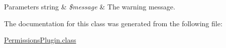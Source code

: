 \begin{DoxyParams}[1]{Parameters}
string & {\em \$message} & The warning message. \\
\hline
\end{DoxyParams}


The documentation for this class was generated from the following file\-:\begin{DoxyCompactItemize}
\item 
\hyperlink{PermissionsPlugin_8class}{Permissions\-Plugin.\-class}\end{DoxyCompactItemize}
